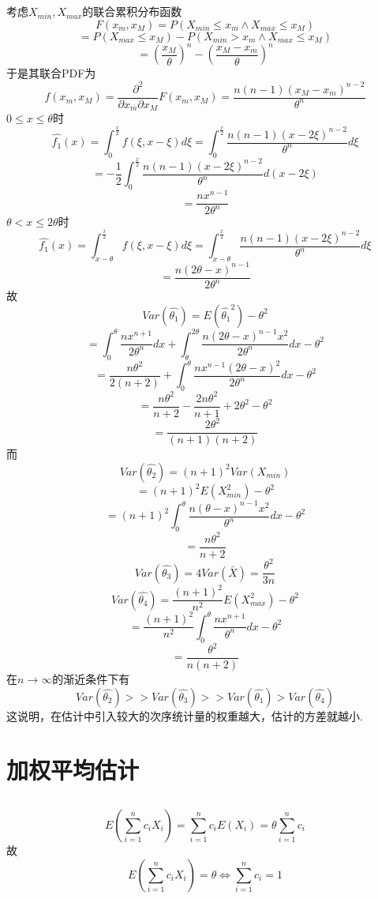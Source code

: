 \documentclass{article}
\begin{document}
\begin{CJK}{UTF8}{gbsn}
\subsection{}
考虑$X_{min},X_{max}$的联合累积分布函数
$$F(x_{m},x_{M})=P(X_{min}\leq x_{m}\land X_{max}\leq x_{M})$$
$$ =P(X_{max}\leq x_{M})-P(X_{min}> x_{m}\land X_{max}\leq x_{M})$$
$$ =(\frac{x_{M}}{\theta})^{n}-(\frac{x_{M}-x_{m}}{\theta})^{n}$$
于是其联合PDF为
$$f(x_{m},x_{M})=\frac{\partial^{2}}{\partial x_{m}\partial x_{M}}F(x_{m},x_{M})=\frac{n(n-1)(x_{M}-x_{m})^{n-2}}{\theta^{n}}$$
$0\leq x\leq\theta$时
$$\hat{f_{1}}(x)=\int_{0}^{\frac{x}{2}}f(\xi,x-\xi)d\xi=\int_{0}^{\frac{x}{2}}\frac{n(n-1)(x-2\xi)^{n-2}}{\theta^{n}}d\xi$$
$$=-\frac{1}{2}\int_{0}^{\frac{x}{2}}\frac{n(n-1)(x-2\xi)^{n-2}}{\theta^{n}}d(x-2\xi)$$
$$=\frac{nx^{n-1}}{2\theta^{n}}$$
$\theta<x\leq 2\theta$时
$$\hat{f_{1}}(x)=\int_{x-\theta}^{\frac{x}{2}}f(\xi,x-\xi)d\xi=\int_{x-\theta}^{\frac{x}{2}}\frac{n(n-1)(x-2\xi)^{n-2}}{\theta^{n}}d\xi$$
$$ =\frac{n(2\theta-x)^{n-1}}{2\theta^{n}}$$
故
$$Var(\hat{\theta_{1}})=E(\hat{\theta_{1}}^{2})-\theta^{2}$$
$$=\int_{0}^{\theta}\frac{nx^{n+1}}{2\theta^{n}}dx+\int_{\theta}^{2\theta}\frac{n(2\theta-x)^{n-1}x^{2}}{2\theta^{n}}dx-\theta^{2}$$
$$=\frac{n\theta^{2}}{2(n+2)}+\int_{0}^{\theta}\frac{nx^{n-1}(2\theta-x)^{2}}{2\theta^{n}}dx-\theta^{2}$$
$$=\frac{n\theta^{2}}{n+2}-\frac{2n\theta^{2}}{n+1}+2\theta^{2}-\theta^{2}$$
$$=\frac{2\theta^{2}}{(n+1)(n+2)}$$
而
$$Var(\hat{\theta_{2}})=(n+1)^{2}Var(X_{min})$$
$$=(n+1)^{2}E(X_{min}^{2})-\theta^{2}$$
$$=(n+1)^{2}\int_{0}^{\theta}\frac{n(\theta-x)^{n-1}x^{2}}{\theta^{n}}dx-\theta^{2}$$
$$=\frac{n\theta^{2}}{n+2}$$
$$Var(\hat{\theta_{3}})=4Var(\bar{X})=\frac{\theta^{2}}{3n}$$
$$Var(\hat{\theta_{4}})=\frac{(n+1)^{2}}{n^{2}}E(X_{max}^{2})-\theta^{2}$$
$$=\frac{(n+1)^{2}}{n^{2}}\int_{0}^{\theta}\frac{nx^{n+1}}{\theta^{n}}dx-\theta^{2}$$
$$=\frac{\theta^{2}}{n(n+2)}$$
在$n\to\infty$的渐近条件下有
$$Var(\hat{\theta_{2}})>>Var(\hat{\theta_{3}})>>Var(\hat{\theta_{1}})>Var(\hat{\theta_{4}})$$
这说明，在估计中引入较大的次序统计量的权重越大，估计的方差就越小.
\section{加权平均估计}
\subsection{}
$$ E(\sum\limits_{i=1}^{n}c_{i}X_{i})=\sum\limits_{i=1}^{n}c_{i}E(X_{i})=\theta\sum\limits_{i=1}^{n}c_{i}$$
故
$$ E(\sum\limits_{i=1}^{n}c_{i}X_{i})=\theta\Leftrightarrow\sum\limits_{i=1}^{n}c_{i}=1$$

\end{CJK}
\end{document}
